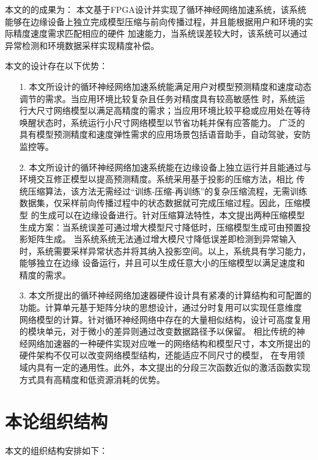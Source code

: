 本文的的成果为： 本文基于FPGA设计并实现了循环神经网络加速系统，该系统能够在边缘设备上独立完成模型压缩与前向传播过程，并且能根据用户和环境的实际精度速度需求匹配相应的硬件
加速能力，当系统误差较大时，该系统可以通过异常检测和环境数据采样实现精度补偿。

本文的设计存在以下优势：

\begin{itemize}
\vspace{4pt}
\item[1.]本文所设计的循环神经网络加速系统能满足用户对模型预测精度和速度动态调节的需求。当应用环境比较复杂且任务对精度具有较高敏感性
时，系统运行大尺寸网络模型以满足高精度的需求；当应用环境比较平稳或应用处在等待唤醒状态时，系统运行小尺寸网络模型以节省功耗并保有应答能力。
广泛的具有模型预测精度和速度弹性需求的应用场景包括语音助手，自动驾驶，安防监控等。　

\vspace{4pt}
\item[2.]本文所设计的循环神经网络加速系统能在边缘设备上独立运行并且能通过与环境交互修正模型以提高预测精度。系统采用基于投影的压缩方法，相比
传统压缩算法，该方法无需经过“训练-压缩-再训练”的复杂压缩流程，无需训练数据集，仅采样前向传播过程中的状态数据就可完成压缩过程。因此，压缩模型
的生成可以在边缘设备进行。针对压缩算法特性，本文提出两种压缩模型生成方案：当系统误差可通过增大模型尺寸降低时，压缩模型生成可由预置投影矩阵生成。
当系统系统无法通过增大模尺寸降低误差即检测到异常输入时，系统需要采样异常状态并将其纳入投影空间。以上，系统具有学习能力，能够独立在边缘
设备运行，并且可以生成任意大小的压缩模型以满足速度和精度的需求。

\vspace{4pt}
\item[3.]本文所提出的循环神经网络加速器硬件设计具有紧凑的计算结构和可配置的功能。计算单元基于矩阵分块的思想设计，通过分时复用可以实现任意维度
网络模型的计算。针对循环神经网络中存在的大量相似结构，设计可高度复用的模块单元，对于微小的差异则通过改变数据路径予以保留。
相比传统的神经网络加速器的一种硬件实现对应唯一的网络结构和模型尺寸，本文所提出的硬件架构不仅可以改变网络模型结构，还能适应不同尺寸的模型，
在专用领域内具有一定的通用性。此外，本文提出的分段三次函数近似的激活函数实现方式具有高精度和低资源消耗的优势。
\vspace{4pt}
\end{itemize}

\section{本论组织结构}
本文的组织结构安排如下：

